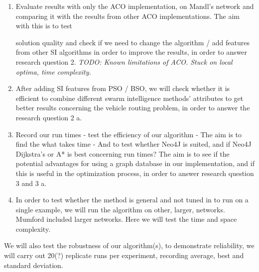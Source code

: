 \begin{enumerate}

\item Evaluate results with only the ACO implementation, on Mandl's network and comparing it with the results from other ACO implementations. The aim with this is to test 

solution quality and check if we need to change the algorithm / add features from other SI algorithms in order to improve the results, in order to answer research question 2. \emph{\color{red} TODO: Known limitations of ACO. Stuck on local optima, time complexity.}

\item After adding SI features from PSO / BSO, we will check whether it is efficient to combine different swarm intelligence methods' attributes to get better results concerning the vehicle routing problem, in order to answer the research question 2 a.

\item Record our run times - test the efficiency of our algorithm - The aim is to find the what takes time - And to test whether Neo4J is suited, and if Neo4J Dijkstra's or A* is best concerning run times? The aim is to see if the potential advantages for using a graph database in our implementation, and if this is useful in the optimization process, in order to answer research question 3 and 3 a.

\item In order to test whether the method is general and not tuned in to run on a single example, we will run the algorithm on other, larger, networks. Mumford included larger networks. Here we will test the time and space complexity.

\end{enumerate}

We will also test the robustness of our algorithm(s), to demonstrate reliability, we will carry out 20(?) replicate runs per experiment, recording average, best and standard deviation. 



